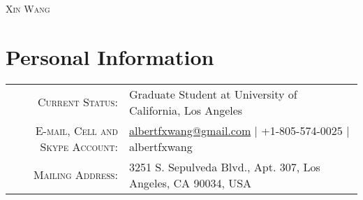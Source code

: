 \documentclass[letterpaper,10pt]{article}
\begin{document}
\par{\centering
  {\LARGE \textsc{Xin Wang}}
\par}

\vspace{-.8em}
\section{Personal Information}
\begin{tabular}{rl}
    \textsc{Current Status:}  & Graduate Student at University of California, Los Angeles \\
    \textsc{E-mail, Cell and Skype Account:}  & \href{mailto:albertfxwang@gmail.com}{albertfxwang@gmail.com}  |  +1-805-574-0025  |  albertfxwang \\
    \textsc{Mailing Address:} & 3251 S. Sepulveda Blvd., Apt. 307, Los Angeles, CA 90034, USA \\
\end{tabular}


\vspace{-.8em}
\end{document}
